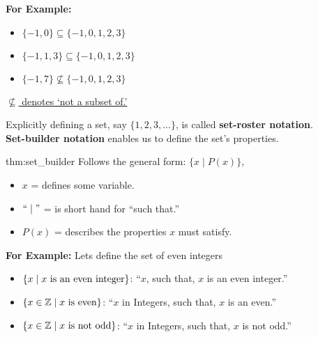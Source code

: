\noindent
\textbf{For Example:}
\begin{itemize}
    \item $\{-1, 0\} \subseteq \{-1, 0, 1, 2, 3\}$
    \item $\{-1, 1, 3\} \subseteq \{-1, 0, 1, 2, 3\}$
    \item $\{-1, 7\} \not\subseteq \{-1, 0, 1, 2, 3\}$
\end{itemize}

\underline{$\not\subseteq$ denotes `not a subset of.'}

\vspace{2em}
\noindent
Explicitly defining a set, say $\{1, 2, 3, ...\}$, is called \textbf{set-roster notation}.\\
\textbf{Set-builder notation} enables us to define the set's properties.

\begin{theo}{thm:set_builder}
    Follows the general form: $\{x \mid P(x)\}$,
    \begin{itemize}
        \item $x$ = defines some variable.
        \item $``\mid"$ = is short hand for ``such that.''
        \item $P(x)$ = describes the properties $x$ must satisfy.
    \end{itemize}
\end{theo}

\noindent
\textbf{For Example:} Lets define the set of even integers\\
\begin{itemize}
    \item $\{x \mid x \textnormal{ is an even integer}\}$: ``$x$, such that, $x$ is an even integer.''
    \item $\{x \in \mathbb{Z} \mid x \textnormal{ is even}\}$: ``$x$ in Integers, such that, $x$ is an even.''
    \item $\{x \in \mathbb{Z} \mid x \textnormal{ is not odd}\}$: ``$x$ in Integers, such that, $x$ is not odd.''

\end{itemize}

